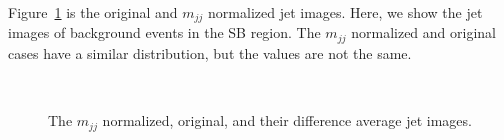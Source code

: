 \documentclass[12pt]{article}
\begin{document}
            Figure~\ref{fig:average_jet_image_origin_mjj_normalized_difference} is the original and $m_{jj}$ normalized jet images. Here, we show the jet images of background events in the SB region. The $m_{jj}$ normalized and original cases have a similar distribution, but the values are not the same.
            \begin{figure}[htpb]
                \centering
                 \\ 
                \caption{The $m_{jj}$ normalized, original, and their difference average jet images.}
                \label{fig:average_jet_image_origin_mjj_normalized_difference}
            \end{figure}
\end{document}
